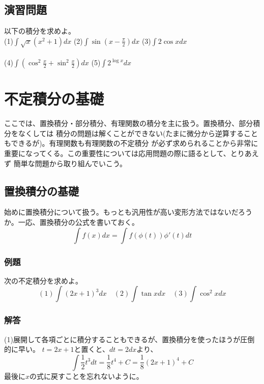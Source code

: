 \documentclass[a4j,dvipdfmx]{jsarticle}
\begin{document}
\subsection{演習問題}
以下の積分を求めよ。\\
(1)$\displaystyle\int \sqrt{x}(x^2+1)dx$
\hspace*{20mm}
(2)$\displaystyle\int\sin(x-\frac{\pi}{2})dx$
\hspace*{20mm}
(3)$\displaystyle\int 2\cos xdx$
\\\\
(4)$\displaystyle \int (\cos^2\frac{x}{2}+\sin^2\frac{x}{2})dx$
\hspace*{12mm}
(5)$\displaystyle\int2^{\log x}dx$

\newpage

\section{不定積分の基礎}
ここでは、置換積分・部分積分、有理関数の積分を主に扱う。置換積分、部分積分をなくしては
積分の問題は解くことができない(たまに微分から逆算することもできるが)。有理関数も有理関数の不定積分
が必ず求められることから非常に重要になってくる。この重要性については応用問題の際に語るとして、とりあえず
簡単な問題から取り組んでいこう。
\subsection{置換積分の基礎}
始めに置換積分について扱う。もっとも汎用性が高い変形方法ではないだろうか。一応、置換積分の公式を書いておく。
\begin{equation*}
    \int f(x)dx = \int f(\phi(t))\phi'(t)dt
\end{equation*}
\subsubsection{例題}
次の不定積分を求めよ。
\begin{equation*}
    (1)\int (2x+1)^3 dx \quad (2)\int\tan x dx \quad (3)\int\cos^2 xdx
\end{equation*}
\subsubsection*{解答}
(1)展開して各項ごとに積分することもできるが、置換積分を使ったほうが圧倒的に早い。
$t=2x+1$と置くと、$dt=2dx$より、
\begin{equation*}
    \int \frac{1}{2}t^3dt=\frac{1}{8}t^4+C =\frac{1}{8}(2x+1)^4+C
\end{equation*}
最後に$x$の式に戻すことを忘れないように。
\end{document}
